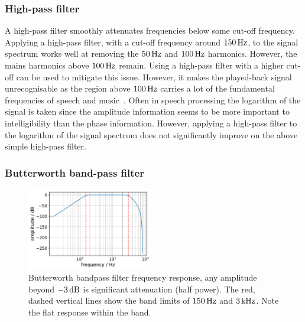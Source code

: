 \documentclass[paper-main.tex]{subfiles}
\begin{document}
\subsubsection{High-pass filter}

A high-pass filter smoothly attenuates frequencies below some cut-off frequency. Applying a high-pass filter, with a cut-off frequency around $150\,{\rm Hz}$, to the signal spectrum works well at removing the $50\,{\rm Hz}$ and $100\,{\rm Hz}$ harmonics. However, the mains harmonics above $100\,{\rm Hz}$ remain. Using a high-pass filter with a higher cut-off can be used to mitigate this issue. However, it makes the played-back signal unrecognisable as the region above $100\,{\rm Hz}$ carries a lot of the fundamental frequencies of speech and music~\cite{speech_intelligibility}.
Often in speech processing the logarithm of the signal is taken since the amplitude information seems to be more important to intelligibility than the phase information. However, applying a high-pass filter to the logarithm of the signal spectrum does not significantly improve on the above simple high-pass filter.


\subsubsection{Butterworth band-pass filter}

\begin{figure}
	\includegraphics[width=0.49\textwidth]{figures/butterworth_150_3000.pdf}
	\caption{Butterworth bandpass filter frequency response, any amplitude beyond $-3\,{\rm dB}$ is significant attenuation (half power). The red, dashed vertical lines show the band limits of $150\,{\rm Hz}$ and $3\,{\rm kHz}$. Note the flat response within the band.}
	\label{fig:butterworth}
\end{figure}
\end{document}
